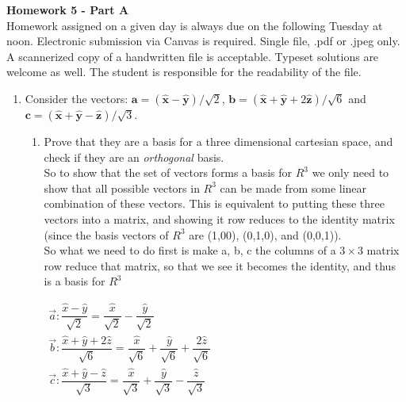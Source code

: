 \documentclass[fleqn]{article}
\begin{document}

{\bf Homework 5 - Part A}\\
Homework assigned on a given day is always due on the following Tuesday at noon. Electronic submission via Canvas is required. Single file, .pdf or .jpeg only.  A scannerized copy of a handwritten file is acceptable. Typeset solutions are welcome as well. The student is responsible for the readability of the file. 

\begin{enumerate}


\item Consider the vectors: $\mathbf{a}=( \mathbf{\hat{x}} - \mathbf{\hat{y}} ) / \sqrt{2} $, $\mathbf{b}=( \mathbf{\hat{x}} + \mathbf{\hat{y}} + 2 \mathbf{\hat{z}} ) / \sqrt{6}$ and $\mathbf{c}=(\mathbf{\hat{x}}+\mathbf{\hat{y}}-\mathbf{\hat{z}})/\sqrt{3}$. 
\begin{enumerate}
\item Prove that they are a basis for a three dimensional cartesian space, and check if they are an \emph{orthogonal} basis. 
\\

So to show that the set of vectors forms a basis for $R^3$ we only need to show that all possible vectors in $R^3$ can be made from some linear combination of these vectors. This is equivalent to putting these three vectors into a matrix, and showing it row reduces to the identity matrix (since the basis vectors of $R^3$ are (1,00), (0,1,0), and (0,0,1)).
\\
So what we need to do first is make a, b, c the columns of a $3\times3$ matrix row reduce that matrix, so that we see it becomes the identity, and thus is a basis for $R^3$

\noindent
$
\begin{array}{lll}
  \overrightarrow{a}: \dfrac{\hat{x}-\hat{y}}{\sqrt{2}}=\dfrac{\hat{x}}{\sqrt{2}}-\dfrac{\hat{y}}{\sqrt{2}} \\
  \overrightarrow{b}: \dfrac{\hat{x}+\hat{y}+2\hat{z}}{\sqrt{6}}=\dfrac{\hat{x}}{\sqrt{6}}+\dfrac{\hat{y}}{\sqrt{6}}+\dfrac{2\hat{z}}{\sqrt{6}} \\
  \overrightarrow{c}: \dfrac{\hat{x}+\hat{y}-\hat{z}}{\sqrt{3}}=\dfrac{\hat{x}}{\sqrt{3}}+\dfrac{\hat{y}}{\sqrt{3}}-\dfrac{\hat{z}}{\sqrt{3}}
  \end{array}  
$
\bigbreak


\end{enumerate}
\end{enumerate}
\end{document}
